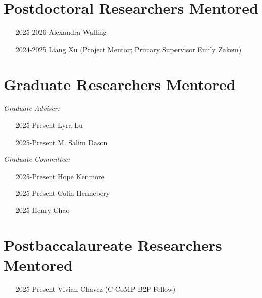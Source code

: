 \documentclass[]{res}
\begin{document}
\begin{resume}
\section{Postdoctoral Researchers Mentored} 
\begin{itemize}
\item[2025-2026] Alexandra Walling 
\item[2024-2025] Liang Xu (Project Mentor; Primary Supervisor Emily Zakem) 
\end{itemize}
\section{Graduate Researchers Mentored} 
\emph{Graduate Adviser:}
\begin{itemize}
\item[2025-Present] Lyra Lu 
\item[2025-Present] M. Salim Dason 
\end{itemize}
\emph{Graduate Committee:}
\begin{itemize}
\item[2025-Present] Hope Kenmore
\item[2025-Present] Colin Hennebery 
\item[2025] Henry Chao 
\end{itemize}
\section{Postbaccalaureate Researchers Mentored} 
\begin{itemize}
\item[2025-Present] Vivian Chavez (C-CoMP B2P Fellow)
\end{itemize}

\end{resume}
\end{document}
